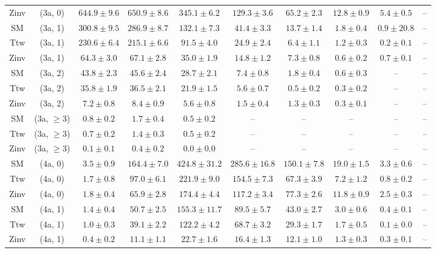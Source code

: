 \begin{table}[h!]
{\begin{tabular}{cccccccccc}
	Zinv & (3a, 0) & $644.9\pm 9.6$ & $650.9\pm 8.6$ & $345.1\pm 6.2$ & $129.3\pm 3.6$ & $65.2\pm 2.3$ & $12.8\pm 0.9$ & $5.4\pm 0.5$ & -- \\[0.5ex] 
	SM & (3a, 1) & $300.8\pm 9.5$ & $286.9\pm 8.7$ & $132.1\pm 7.3$ & $41.4\pm 3.3$ & $13.7\pm 1.4$ & $1.8\pm 0.4$ & $0.9\pm 20.8$ & -- \\[0.5ex] 
	Ttw & (3a, 1) & $230.6\pm 6.4$ & $215.1\pm 6.6$ & $91.5\pm 4.0$ & $24.9\pm 2.4$ & $6.4\pm 1.1$ & $1.2\pm 0.3$ & $0.2\pm 0.1$ & -- \\[0.5ex] 
	Zinv & (3a, 1) & $64.3\pm 3.0$ & $67.1\pm 2.8$ & $35.0\pm 1.9$ & $14.8\pm 1.2$ & $7.3\pm 0.8$ & $0.6\pm 0.2$ & $0.7\pm 0.1$ & -- \\[0.5ex] 
	SM & (3a, 2) & $43.8\pm 2.3$ & $45.6\pm 2.4$ & $28.7\pm 2.1$ & $7.4\pm 0.8$ & $1.8\pm 0.4$ & $0.6\pm 0.3$ & -- & -- \\[0.5ex] 
	Ttw & (3a, 2) & $35.8\pm 1.9$ & $36.5\pm 2.1$ & $21.9\pm 1.5$ & $5.6\pm 0.7$ & $0.5\pm 0.2$ & $0.3\pm 0.2$ & -- & -- \\[0.5ex] 
	Zinv & (3a, 2) & $7.2\pm 0.8$ & $8.4\pm 0.9$ & $5.6\pm 0.8$ & $1.5\pm 0.4$ & $1.3\pm 0.3$ & $0.3\pm 0.1$ & -- & -- \\[0.5ex] 
	SM & (3a, $\ge3$) & $0.8\pm 0.2$ & $1.7\pm 0.4$ & $0.5\pm 0.2$ & -- & -- & -- & -- & -- \\[0.5ex] 
	Ttw & (3a, $\ge3$) & $0.7\pm 0.2$ & $1.4\pm 0.3$ & $0.5\pm 0.2$ & -- & -- & -- & -- & -- \\[0.5ex] 
	Zinv & (3a, $\ge3$) & $0.1\pm 0.1$ & $0.4\pm 0.2$ & $0.0\pm 0.0$ & -- & -- & -- & -- & -- \\[0.5ex] 
	SM & (4a, 0) & $3.5\pm 0.9$ & $164.4\pm 7.0$ & $424.8\pm 31.2$ & $285.6\pm 16.8$ & $150.1\pm 7.8$ & $19.0\pm 1.5$ & $3.3\pm 0.6$ & -- \\[0.5ex] 
	Ttw & (4a, 0) & $1.7\pm 0.8$ & $97.0\pm 6.1$ & $221.9\pm 9.0$ & $154.5\pm 7.3$ & $67.3\pm 3.9$ & $7.2\pm 1.2$ & $0.8\pm 0.2$ & -- \\[0.5ex] 
	Zinv & (4a, 0) & $1.8\pm 0.4$ & $65.9\pm 2.8$ & $174.4\pm 4.4$ & $117.2\pm 3.4$ & $77.3\pm 2.6$ & $11.8\pm 0.9$ & $2.5\pm 0.3$ & -- \\[0.5ex] 
	SM & (4a, 1) & $1.4\pm 0.4$ & $50.7\pm 2.5$ & $155.3\pm 11.7$ & $89.5\pm 5.7$ & $43.0\pm 2.7$ & $3.0\pm 0.6$ & $0.4\pm 0.1$ & -- \\[0.5ex] 
	Ttw & (4a, 1) & $1.0\pm 0.3$ & $39.1\pm 2.2$ & $122.2\pm 4.2$ & $68.7\pm 3.2$ & $29.3\pm 1.7$ & $1.7\pm 0.5$ & $0.1\pm 0.0$ & -- \\[0.5ex] 
	Zinv & (4a, 1) & $0.4\pm 0.2$ & $11.1\pm 1.1$ & $22.7\pm 1.6$ & $16.4\pm 1.3$ & $12.1\pm 1.0$ & $1.3\pm 0.3$ & $0.3\pm 0.1$ & -- \\[0.5ex] 

\end{tabular}}
\end{table}
